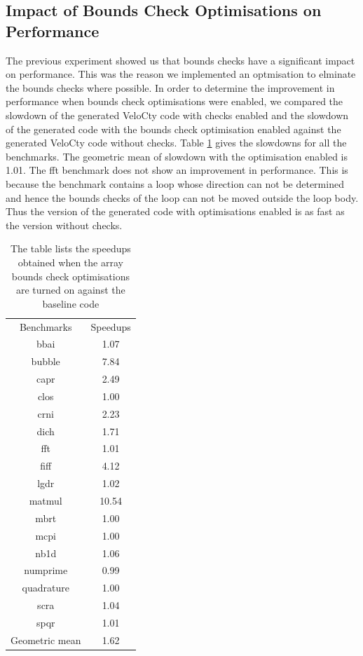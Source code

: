 \subsection{Impact of Bounds Check Optimisations on Performance}
The previous experiment showed us that bounds checks have a significant impact on performance. This was the reason we implemented an optmisation to elminate the bounds checks where possible. In order to determine the improvement in performance when bounds check optimisations were enabled, we compared the slowdown of the generated VeloCty code with checks enabled  and the slowdown of the generated code with the bounds check optimisation enabled against the generated VeloCty code without checks. Table \ref{tab:CwvsCbc} gives the slowdowns for all the benchmarks. The geometric mean of slowdown with the optimisation enabled is 1.01. The \textsf{fft} benchmark does not show an improvement in performance. This is because the benchmark contains a loop whose direction can not be determined and hence the bounds checks of the loop can not be moved outside the loop body. Thus the version of the generated code with optimisations enabled is as fast as the version without checks. 
\begin{table}[h]
\centering
\begin{tabular}{|c|c|}
\hline
Benchmarks     & Speedups \\ \hhline{|=|=|}
bbai           & 1.07     \\ \hline
bubble         & 7.84     \\ \hline
capr           & 2.49     \\ \hline
clos           & 1.00     \\ \hline
crni           & 2.23     \\ \hline
dich           & 1.71     \\ \hline
fft            & 1.01     \\ \hline
fiff           & 4.12     \\ \hline
lgdr           & 1.02     \\ \hline
matmul         & 10.54    \\ \hline
mbrt           & 1.00     \\ \hline
mcpi           & 1.00     \\ \hline
nb1d           & 1.06     \\ \hline
numprime       & 0.99     \\ \hline
quadrature     & 1.00     \\ \hline
scra           & 1.04     \\ \hline
spqr           & 1.01     \\ \hline
Geometric mean & 1.62     \\ \hline
\end{tabular}
\caption[Speedup of \velocty with bounds check optimisation turned on]{The table lists the speedups obtained when the array bounds check optimisations are turned on against the baseline \velocty code}
\label{tab:CwvsCbc}
\end{table}

